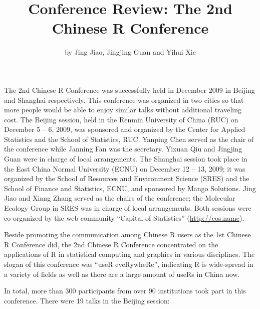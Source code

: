 \title{Conference Review: The 2nd Chinese R Conference}
\author{by Jing Jiao, Jingjing Guan and Yihui Xie}

\maketitle

The 2nd Chinese R Conference was successfully held in December 2009
in Beijing and Shanghai respectively. This conference was organized
in two cities so that more people would be able to enjoy similar
talks without additional traveling cost. The Beijing session, held
in the Renmin University of China (RUC) on December 5 -- 6, 2009,
was sponsored and organized by the Center for Applied Statistics and
the School of Statistics, RUC. Yanping Chen served as the chair of
the conference while Janning Fan was the secretary. Yixuan Qiu and
Jingjing Guan were in charge of local arrangements. The Shanghai
session took place in the East China Normal University (ECNU) on
December 12 -- 13, 2009; it was organized by the School of Resources
and Environment Science (SRES) and the School of Finance and
Statistics, ECNU, and sponsored by Mango Solutions. Jing Jiao and
Xiang Zhang served as the chairs of the conference; the Molecular
Ecology Group in SRES was in charge of local arrangements. Both
sessions were co-organized by the web community ``Capital of
Statistics'' (\url{http://cos.name}).

Beside promoting the communication among Chinese R users as the 1st
Chinese R Conference did, the 2nd Chinese R Conference concentrated
on the applications of R in statistical computing and graphics in
various disciplines. The slogan of this conference was ``useR
eveRywheRe'', indicating R is wide-spread in a variety of fields as
well as there are a large amount of useRs in China now.

In total, more than 300 participants from over 90 institutions took
part in this conference. There were 19 talks in the Beijing session:

